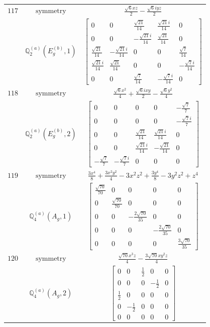 \documentclass[fleqn,8pt,landscape]{jsarticle}
\begin{document}
\begin{longtable}{ccc}
$ 117 $ & $ \text{symmetry} $ & $ \frac{\sqrt{6} x z}{2} - \frac{\sqrt{6} i y z}{2} $ \\
$  $ & $ \mathbb{Q}_{2}^{(a)}(E_{g}^{(b)},1) $ & $ \begin{bmatrix} 0 & 0 & \frac{\sqrt{21}}{14} & \frac{\sqrt{21} i}{14} & 0 \\ 0 & 0 & - \frac{\sqrt{21} i}{14} & \frac{\sqrt{21}}{14} & 0 \\ \frac{\sqrt{21}}{14} & - \frac{\sqrt{21} i}{14} & 0 & 0 & \frac{\sqrt{7}}{14} \\ \frac{\sqrt{21} i}{14} & \frac{\sqrt{21}}{14} & 0 & 0 & - \frac{\sqrt{7} i}{14} \\ 0 & 0 & \frac{\sqrt{7}}{14} & - \frac{\sqrt{7} i}{14} & 0 \end{bmatrix} $ \\ \hline
$ 118 $ & $ \text{symmetry} $ & $ \frac{\sqrt{6} x^{2}}{4} + \frac{\sqrt{6} i x y}{2} - \frac{\sqrt{6} y^{2}}{4} $ \\
$  $ & $ \mathbb{Q}_{2}^{(a)}(E_{g}^{(b)},2) $ & $ \begin{bmatrix} 0 & 0 & 0 & 0 & - \frac{\sqrt{7}}{7} \\ 0 & 0 & 0 & 0 & - \frac{\sqrt{7} i}{7} \\ 0 & 0 & \frac{\sqrt{21}}{14} & \frac{\sqrt{21} i}{14} & 0 \\ 0 & 0 & \frac{\sqrt{21} i}{14} & - \frac{\sqrt{21}}{14} & 0 \\ - \frac{\sqrt{7}}{7} & - \frac{\sqrt{7} i}{7} & 0 & 0 & 0 \end{bmatrix} $ \\ \hline
$ 119 $ & $ \text{symmetry} $ & $ \frac{3 x^{4}}{8} + \frac{3 x^{2} y^{2}}{4} - 3 x^{2} z^{2} + \frac{3 y^{4}}{8} - 3 y^{2} z^{2} + z^{4} $ \\
$  $ & $ \mathbb{Q}_{4}^{(a)}(A_{g},1) $ & $ \begin{bmatrix} \frac{\sqrt{70}}{70} & 0 & 0 & 0 & 0 \\ 0 & \frac{\sqrt{70}}{70} & 0 & 0 & 0 \\ 0 & 0 & - \frac{2 \sqrt{70}}{35} & 0 & 0 \\ 0 & 0 & 0 & - \frac{2 \sqrt{70}}{35} & 0 \\ 0 & 0 & 0 & 0 & \frac{3 \sqrt{70}}{35} \end{bmatrix} $ \\ \hline
$ 120 $ & $ \text{symmetry} $ & $ \frac{\sqrt{70} x^{3} z}{4} - \frac{3 \sqrt{70} x y^{2} z}{4} $ \\
$  $ & $ \mathbb{Q}_{4}^{(a)}(A_{g},2) $ & $ \begin{bmatrix} 0 & 0 & \frac{1}{2} & 0 & 0 \\ 0 & 0 & 0 & - \frac{1}{2} & 0 \\ \frac{1}{2} & 0 & 0 & 0 & 0 \\ 0 & - \frac{1}{2} & 0 & 0 & 0 \\ 0 & 0 & 0 & 0 & 0 \end{bmatrix} $ \\ \hline

\end{longtable}
\end{document}
